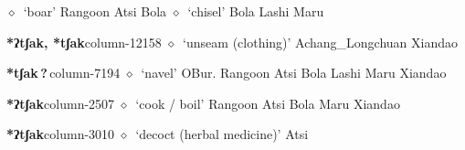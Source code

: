 \hspace{1ex}
         $\diamond$~`boar'
         Rangoon 
\hspace{1ex}
         Atsi 
\hspace{1ex}
         Bola 
\hspace{1ex}
         $\diamond$~`chisel'
         Bola 
\hspace{1ex}
         Lashi 
\hspace{1ex}
         Maru 
  \item {\footnotesize \textbf{*ʔtʃak, *tʃak}}{\tiny column-12158}
         $\diamond$~`unseam (clothing)'
         Achang\_Longchuan 
\hspace{1ex}
         Xiandao 
  \item {\footnotesize \textbf{*tʃak\,?\,}}{\tiny column-7194}
         $\diamond$~`navel'
         OBur. 
\hspace{1ex}
         Rangoon 
\hspace{1ex}
         Atsi 
\hspace{1ex}
         Bola 
\hspace{1ex}
         Lashi 
\hspace{1ex}
         Maru 
\hspace{1ex}
         Xiandao 
  \item {\footnotesize \textbf{*ʔtʃak}}{\tiny column-2507}
         $\diamond$~`cook / boil'
         Rangoon 
\hspace{1ex}
         Atsi 
\hspace{1ex}
         Bola 
\hspace{1ex}
         Maru 
\hspace{1ex}
         Xiandao 
  \item {\footnotesize \textbf{*ʔtʃak}}{\tiny column-3010}
         $\diamond$~`decoct (herbal medicine)'
         Atsi 
